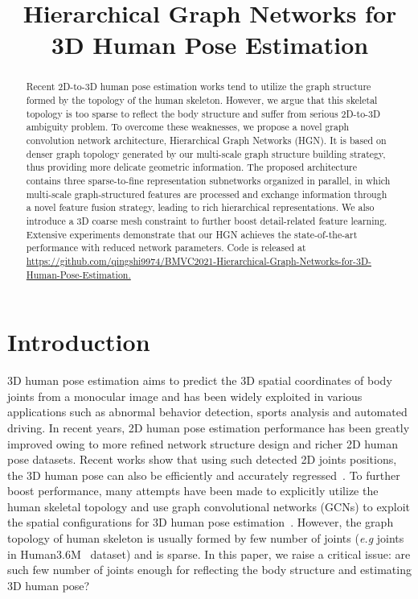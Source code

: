 \documentclass{bmvc2k}
\title{Hierarchical Graph Networks for\\ 3D Human Pose Estimation}
\def\eg{\emph{e.g}\bmvaOneDot}
\begin{document}
\abovedisplayshortskip=0pt
\belowdisplayshortskip=0pt
\abovedisplayskip=0pt
\belowdisplayskip=0pt
\maketitle

\begin{abstract}
Recent 2D-to-3D human pose estimation works tend to utilize the graph structure formed by the topology of the human skeleton. However, we argue that this skeletal topology is too sparse to reflect the body structure and suffer from serious 2D-to-3D ambiguity problem. To overcome these weaknesses, we propose a novel graph convolution network architecture, Hierarchical Graph Networks (HGN). It is based on denser graph topology generated by our multi-scale graph structure building strategy, thus providing more delicate geometric information. The proposed architecture contains three sparse-to-fine representation subnetworks organized in parallel, in which multi-scale graph-structured features are processed and exchange information through a novel feature fusion strategy, leading to rich hierarchical representations. We also introduce a 3D coarse mesh constraint to further boost detail-related feature learning. Extensive experiments demonstrate that our HGN achieves the state-of-the-art performance with reduced network parameters. Code is released at
 \href{https://github.com/qingshi9974/BMVC2021-Hierarchical-Graph-Networks-for-3D-Human-Pose-Estimation}{https://github.com/qingshi9974/BMVC2021-Hierarchical-Graph-Networks-for-3D-Human-Pose-Estimation.}





\end{abstract}

\section{Introduction}
\label{sec:in}
3D human pose estimation aims to predict the 3D spatial coordinates of body joints from a monocular image and has been widely exploited in various applications such as abnormal behavior detection, sports analysis and automated driving. In recent years, 2D human pose estimation performance has been greatly improved owing to more refined network structure design and richer 2D human pose datasets. Recent works show that using such detected 2D joints positions, the 3D human pose can also be efficiently and accurately regressed~\cite{pavllo20193d,2017simple,2020Deep,fang2018learning,cheng2019occlusion}. To further boost performance, many attempts have been made to explicitly utilize the  human skeletal topology and use graph convolutional networks (GCNs) to exploit the spatial configurations for 3D human pose estimation~\cite{2019Exploiting,zhao2019semantic,2021Graph,liu2020comprehensive}. However, the graph topology of human skeleton is usually formed by few number of joints (\eg 17 joints in Human3.6M~\cite{ionescu2013human3} dataset) and is sparse. In this paper, we raise a critical issue: are such few number of joints enough for reflecting the body structure and estimating 3D human pose?
\end{document}
